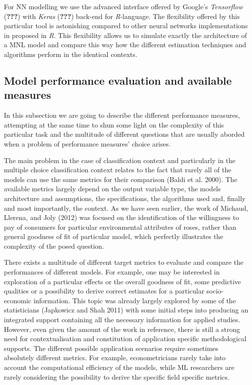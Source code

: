 \documentclass[11pt,]{article}
\begin{document}
For NN modelling we use the advanced interface offered by Google's
\emph{Tensorflow} ({\textbf{???}}) with \emph{Keras} ({\textbf{???}})
back-end for \emph{R}-language. The flexibility offered by this
particular tool is astonishing compared to other neural networks
implementations in proposed in \emph{R}. This flexibility allows us to
simulate exactly the architecture of a MNL model and compare this way
how the different estimation techniques and algorithms perform in the
identical contexts.

\hypertarget{model-performance-evaluation-and-available-measures}{%
\subsection{Model performance evaluation and available
measures}\label{model-performance-evaluation-and-available-measures}}

In this subsection we are going to describe the different performance
measures, attempting at the same time to shun some light on the
complexity of this particular task and the multitude of different
questions that are usually aborded when a problem of performance
measures' choice arises.

The main problem in the case of classification context and particularly
in the multiple choice classification context relates to the fact that
rarely all of the models can use the same metrics for their comparison
(Baldi et al. 2000). The available metrics largely depend on the output
variable type, the models architecture and assumptions, the
specifications, the algorithms used and, finally and most importantly,
the context. As we have seen earlier, the work of Michaud, Llerena, and
Joly (2012) was focused on the identification of the willingness to pay
of consumers for particular environmental attributes of roses, rather
than general goodness of fit of particular model, which perfectly
illustrates the complexity of the posed question.

There exists a multitude of different target metrics to evaluate and
compare the performances of different models. For example, one may be
interested in exploration of a particular effects or the overall
goodness of fit, some predictive qualities or a possibility to derive
correct estimates for a particular socio-economic information. This
topic was already largely explored by some of the statisticians
(Japkowicz and Shah 2011) with some initial steps into producing an
integrated support containing all the necessary information for applied
studies. However, even given the amount of the work in reference, there
is still a strong need for contextualisation and constitution of
application specific methodological supports. The different possible
application scenarios require sometimes absolutely different metrics.
For example, econometricians rarely take into account the computational
efficiency of the models, while ML researchers are rarely considering
the possibility to derive the specific field specific metrics.
\end{document}
